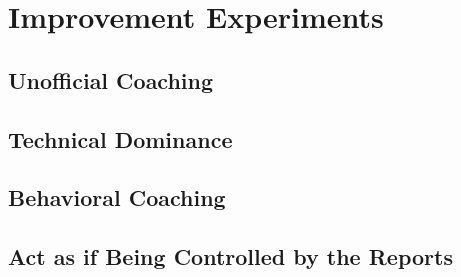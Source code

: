 \chapter{Improvement Experiments}
\label{chapter:improvement}

\section{Unofficial Coaching}
\label{sec:un-coach}

\section{Technical Dominance}
\label{sec:tech-dom}

\section{Behavioral Coaching}
\label{sec:beh-coach}

\section{Act as if Being Controlled by the Reports}
\label{sec:under-control}
